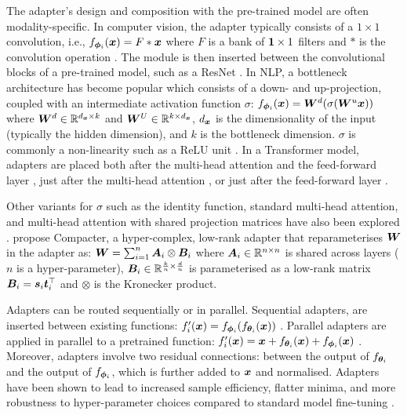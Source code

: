 \documentclass[10pt]{article} %
\begin{document}
The adapter's design and composition with the pre-trained model are often modality-specific. In computer vision, the adapter typically consists of a $1 \times 1$ convolution, i.e., $f_{{\bm{\phi}}_i}({\bm{x}}) = F * {\bm{x}}$ where $F$ is a bank of $\bm{1} \times 1$ filters and $*$ is the convolution operation \citep{Rebuffi2017Adapters1}. The module is then inserted between the convolutional blocks of a pre-trained model, such as a ResNet \citep{He2016ResNet}. In NLP, a bottleneck architecture has become popular which consists of a down- and up-projection, coupled with an intermediate activation function $\sigma$: $f_{{\bm{\phi}}_i}({\bm{x}}) =  {\bm{W}}^d(\sigma({\bm{W}}^u {\bm{x}}))$ where ${\bm{W}}^d \in \mathbb{R}^{d_{\bm{x}} \times k}$ and ${\bm{W}}^U \in \mathbb{R}^{k \times d_{\bm{x}}}$, $d_{\bm{x}}$ is the dimensionality of the input (typically the hidden dimension), and $k$ is the bottleneck dimension. $\sigma$ is commonly a non-linearity such as a ReLU unit \citep[Figure~\ref{fig:nature_modularity:bottleneckadapter}; ][]{houlsby2019parameter,pfeiffer-etal-2020-mad}. 
In a Transformer model, adapters are placed both after the multi-head attention and the feed-forward layer \citep{houlsby2019parameter},  just after the multi-head attention \citep{Bapna2019Adapters}, or just after  the feed-forward layer \citep{pfeiffer-etal-2020-mad}. 

Other variants for $\sigma$ such as the identity function, standard multi-head attention, and multi-head attention with shared projection matrices have also been explored \citep{Stickland2019BERTPALs}. \citet{Mahabadi2021Compacter} propose Compacter, a hyper-complex, low-rank adapter that reparameterises ${\bm{W}}$ in the adapter as: ${\bm{W}} = \sum^n_{i=1} {\bm{A}}_i \otimes {\bm{B}}_i$ where ${\bm{A}}_i \in \mathbb{R}^{n \times n}$ is shared across layers ($n$ is a hyper-parameter), ${\bm{B}}_i \in \mathbb{R}^{\frac{k}{n} \times \frac{d}{n}}$ is parameterised as a low-rank matrix ${\bm{B}}_i = {\bm{s}}_i {\bm{t}}_i^\top$ and $\otimes$ is the Kronecker product.

Adapters can be routed sequentially or in parallel. Sequential adapters, are inserted between existing functions: $f_i^\prime({\bm{x}}) = f_{{\bm{\phi}}_i}(f_{{\bm{\theta}}_i}({\bm{x}}))$ \citep{Rebuffi2017Adapters1,houlsby2019parameter}. Parallel adapters are applied in parallel to a pretrained function: $f_i^\prime({\bm{x}}) = {\bm{x}} + f_{{\bm{\theta}}_i}({\bm{x}}) + f_{{\bm{\phi}}_i}({\bm{x}})$ \citep[Figure~\ref{fig:nature_modularity:paralleladapter}; ][]{Rebuffi2018Adapters2,Stickland2019BERTPALs,He2021UnifiedAdapters}. 
Moreover, adapters involve two residual connections: between the output of $f_{{\bm{\theta}}_i}$ and the output of $f_{{\bm{\phi}}_i}$, which is further added to ${\bm{x}}$ and normalised.
Adapters have been shown to lead to increased sample efficiency, flatter minima, and more robustness to hyper-parameter choices compared to standard model fine-tuning \citep{mahabadi2021parameter,he-etal-2021-effectiveness,han-etal-2021-robust}.
\end{document}
